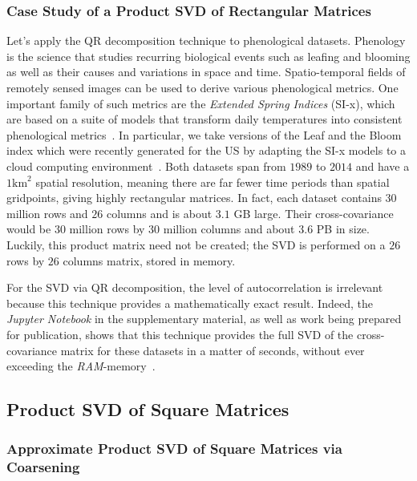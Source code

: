 \documentclass[ijgi,article,submit,moreauthors,pdftex,10pt,a4paper]{Definitions/mdpi}
\begin{document}
\subsubsection{Case Study of a Product SVD of Rectangular Matrices}
\label{sec:Results/Case Study of a Product SVD of Rectangular Matrices}

Let's apply the QR decomposition technique to phenological datasets. Phenology is the science that studies recurring biological events such as leafing and blooming as well as their causes and variations in space and time. Spatio-temporal fields of remotely sensed images can be used to derive various phenological metrics. One important family of such metrics are the \textit{Extended Spring Indices} (SI-x), which are based on a suite of models that transform daily temperatures into consistent phenological metrics~\cite{Schwartz2013}. In particular, we take versions of the Leaf and the Bloom index which were recently generated for the US by adapting the SI-x models to a cloud computing environment~\cite{Izquierdo2015}. Both datasets span from $1989$ to $2014$ and have a $1\text{km}^2$ spatial resolution, meaning there are far fewer time periods than spatial gridpoints, giving highly rectangular matrices. In fact, each dataset contains $30$ million rows and $26$ columns and is about $3.1$ GB large. Their cross-covariance would be $30$ million rows by $30$ million columns and about $3.6$ PB in size. Luckily, this product matrix need not be created; the SVD is performed on a $26$ rows by $26$ columns matrix, stored in memory.

For the SVD via QR decomposition, the level of autocorrelation is irrelevant because this technique provides a mathematically exact result. Indeed, the \textit{Jupyter Notebook} in the supplementary material, as well as work being prepared for publication, shows that this technique provides the full SVD of the cross-covariance matrix for these datasets in a matter of seconds, without ever exceeding the \textit{RAM}-memory~\cite{Bogaardt2018, ZuritaMilla2018}.

\subsection{Product SVD of Square Matrices}
\label{sec:Results/Product SVD of Square Matrices}

\subsubsection{Approximate Product SVD of Square Matrices via Coarsening}
\label{sec:Results/Approximate Product SVD of Square Matrices via Coarsening}
\end{document}
